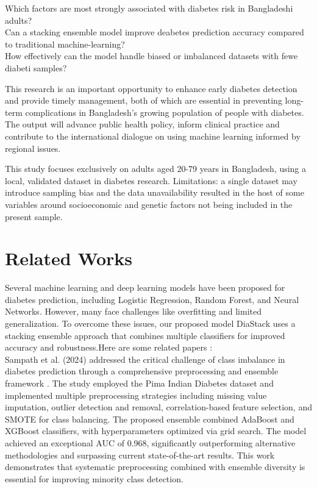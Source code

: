 \documentclass[conference, letterpaper]{IEEEtran}
\begin{document}
Which factors are most strongly associated with diabetes risk in Bangladeshi adults?\\
Can a stacking ensemble model improve deabetes prediction accuracy compared to traditional machine-learning?\\
How effectively can the model handle biased or imbalanced datasets with fewe diabeti samples?

This research is an important opportunity to enhance early diabetes detection and provide timely management, both of which are essential in preventing long-term complications in Bangladesh's growing population of people with diabetes. The output will advance public health policy, inform clinical practice and contribute to the international dialogue on using machine learning informed by regional issues.

This study focuses exclusively on adults aged 20-79 years in Bangladesh, using a local, validated dataset in diabetes research.
Limitations: a single dataset may introduce sampling bias and the data unavailability resulted in the host of some variables around socioeconomic and genetic factors not being included in the present sample.

\section{Related Works}
\label{sec:related}
Several machine learning and deep learning models have been proposed for diabetes prediction, including Logistic Regression, Random Forest, and Neural Networks. However, many face challenges like overfitting and limited generalization. To overcome these issues, our proposed model DiaStack uses a stacking ensemble approach that combines multiple classifiers for improved accuracy and robustness.Here are some related papers :\\

Sampath et al. (2024) addressed the critical challenge of class imbalance in diabetes prediction through a comprehensive preprocessing and ensemble framework\cite{sampath2024robust} . The study employed the Pima Indian Diabetes dataset and implemented multiple preprocessing strategies including missing value imputation, outlier detection and removal, correlation-based feature selection, and SMOTE for class balancing. The proposed ensemble combined AdaBoost and XGBoost classifiers, with hyperparameters optimized via grid search. The model achieved an exceptional AUC of 0.968, significantly outperforming alternative methodologies and surpassing current state-of-the-art results. This work demonstrates that systematic preprocessing combined with ensemble diversity is essential for improving minority class detection.\\
\end{document}

